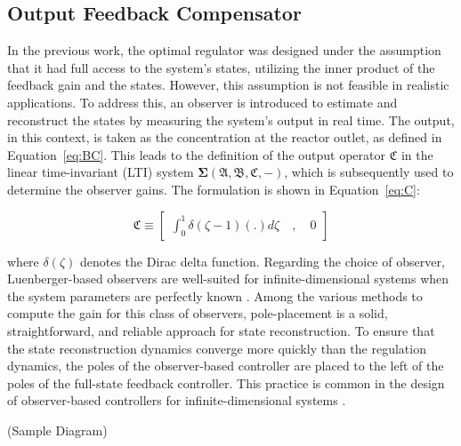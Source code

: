 \subsection{Output Feedback Compensator}

In the previous work, the optimal regulator was designed under the assumption that it had full access to the system's states, utilizing the inner product of the feedback gain and the states. However, this assumption is not feasible in realistic applications. To address this, an observer is introduced to estimate and reconstruct the states by measuring the system's output in real time. The output, in this context, is taken as the concentration at the reactor outlet, as defined in Equation~\ref{eq:BC}. This leads to the definition of the output operator $\mathfrak{C}$ in the linear time-invariant (LTI) system $\mathbf{\Sigma(\mathfrak{A},\mathfrak{B},\mathfrak{C},-)}$, which is subsequently used to determine the observer gains. The formulation is shown in Equation~\ref{eq:C}:

\begin{equation} \label{eq:C}
    \mathfrak{C} \equiv \begin{bmatrix}
        \int_0^1 \delta(\zeta-1) (.) d\zeta \quad , \quad 0
    \end{bmatrix}
\end{equation}

where $\delta(\zeta)$ denotes the Dirac delta function. Regarding the choice of observer, Luenberger-based observers are well-suited for infinite-dimensional systems when the system parameters are perfectly known \autocite{ali2015reviewobserver}. Among the various methods to compute the gain for this class of observers, pole-placement is a solid, straightforward, and reliable approach for state reconstruction. To ensure that the state reconstruction dynamics converge more quickly than the regulation dynamics, the poles of the observer-based controller are placed to the left of the poles of the full-state feedback controller. This practice is common in the design of observer-based controllers for infinite-dimensional systems \autocite{morrisbook}.

(Sample Diagram)

